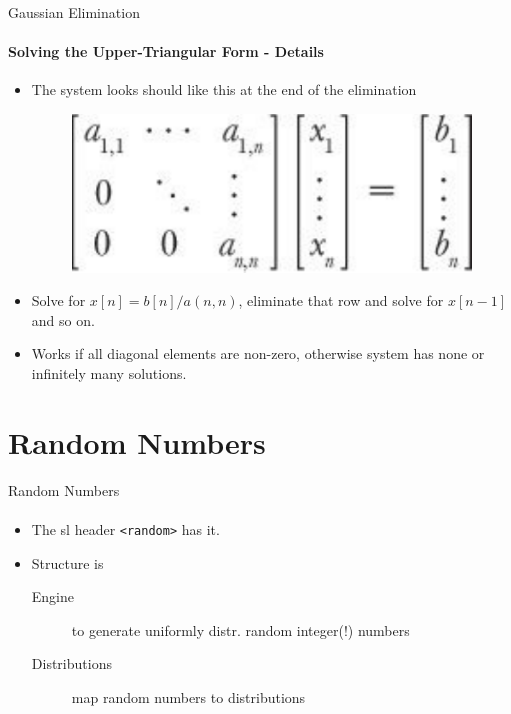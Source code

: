 \documentclass[presentation]{beamer}
\begin{document}
\begin{frame}{Gaussian Elimination}
\framesubtitle{Solving the Upper-Triangular Form - Details}

\begin{itemize}
\item The system looks should like this at the end of the elimination
  \begin{figure}[h]
    \centering
    \includegraphics[scale=.5]{images/uppertriangularform}
  \end{figure}
\item Solve for $x[n] = b[n]/a(n,n)$, eliminate that row and solve for
  $x[n-1]$ and so on.
\item Works if all diagonal elements are non-zero, otherwise system
  has none or infinitely many solutions. 
\end{itemize}

\end{frame}

\section{Random Numbers}

\begin{frame}{Random Numbers}
\framesubtitle{}

\begin{itemize}
\item The sl header \texttt{<random>} has it.
\item Structure is
  \begin{description}
  \item[Engine] to generate uniformly distr. random integer(!) numbers
  \item[Distributions] map random numbers to distributions
  \end{description}
\end{itemize}

\end{frame}
\end{document}
